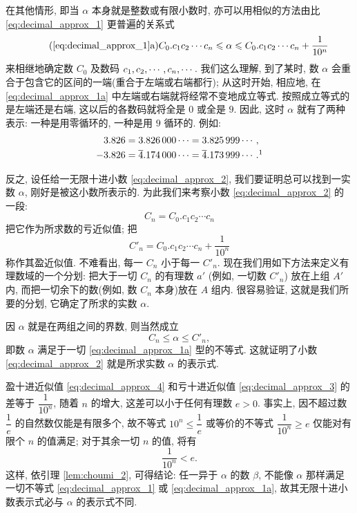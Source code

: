 在其他情形, 即当 $\alpha$ 本身就是整数或有限小数时,
亦可以用相似的方法由比 \eqref{eq:decimal_approx_1} 更普遍的关系式
\begin{equation}\label{eq:decimal_approx_1a}
\tag{\ref*{eq:decimal_approx_1}a}
C_0.c_1 c_2 \cdots c_n \leq \alpha \leq C_0.c_1 c_2 \cdots c_n + \dfrac{1}{10^n}
\end{equation}
来相继地确定数 $C_0$ 及数码 $\seq[n]{c}, \cdots$.
我们这么理解, 到了某时, 数 $\alpha$ 会重合于包含它的区间的一端(重合于左端或右端都行);
从这时开始, 相应地, 在 \eqref{eq:decimal_approx_1a} 中左端或右端就将经常不变地成立等式.
按照成立等式的是左端还是右端, 这以后的各数码就将全是 $0$ 或全是 $9$.
因此, 这时 $\alpha$ 就有了两种表示:
一种是用零循环的, 一种是用 $9$ 循环的.
例如:
$$\begin{aligned}
3.826 &= 3.826\,000\cdots = 3.825\,999\cdots, \\
-3.826 &=\overline{4}.174\,000\cdots = \overline{4}.173\,999\cdots. \footnotemark
\end{aligned}$$

反之, 设任给一无限十进小数 \eqref{eq:decimal_approx_2},
我们要证明总可以找到一实数 $\alpha$, 刚好是被这小数所表示的.
为此我们来考察小数 \eqref{eq:decimal_approx_2} 的一段:
\begin{equation}\label{eq:decimal_approx_3}
C_n = C_0.c_1 c_2 \cdots c_n
\end{equation}
把它作为所求数的{\kaishu 亏近似值}; 把
\begin{equation}\label{eq:decimal_approx_4}
C'_n = C_0.c_1 c_2 \cdots c_n + \dfrac{1}{10^n}
\end{equation}
称作其{\kaishu 盈近似值}.
不难看出, 每一 $C_n$ 小于每一 $C'_n$.
现在我们用如下方法来定义有理数域的一个分划:
把大于一切 $C_n$ 的有理数 $a'$ (例如, 一切数 $C'_n$) 放在上组 $A'$ 内,
而把一切余下的数(例如, 数 $C_n$ 本身)放在 $A$ 组内.
很容易验证, 这就是我们所要的分划, 它确定了所求的实数 $\alpha$.

因 $\alpha$ 就是在两组之间的界数, 则当然成立
$$
C_n \leq \alpha \leq C'_n,
$$
即数 $\alpha$ 满足于一切 \eqref{eq:decimal_approx_1a} 型的不等式.
这就证明了小数 \eqref{eq:decimal_approx_2} 就是所求实数 $\alpha$ 的表示式.

盈十进近似值 \eqref{eq:decimal_approx_4} 和亏十进近似值 \eqref{eq:decimal_approx_3} 的差等于 $\dfrac{1}{10^n}$,
随着 $n$ 的增大, 这差可以小于任何有理数 $e > 0$.
事实上, 因不超过数 $\dfrac{1}{e}$ 的自然数仅能是有限多个,
故不等式 $10^n \leq \dfrac{1}{e}$ 或等价的不等式 $\dfrac{1}{10^n}\geq e$ 仅能对有限个 $n$ 的值满足;
对于其余一切 $n$ 的值, 将有
$$
\dfrac{1}{10^n} < e.
$$
这样, 依引理 \ref{lem:choumi_2}, 可得结论:
任一异于 $\alpha$ 的数 $\beta$, 不能像 $\alpha$ 那样满足一切不等式 \eqref{eq:decimal_approx_1} 或 \eqref{eq:decimal_approx_1a},
故其无限十进小数表示式必与 $\alpha$ 的表示式不同.

